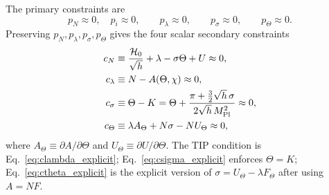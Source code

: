 \documentclass[aps,prd,reprint,nofootinbib,superscriptaddress,longbibliography]{revtex4-2}
\newcommand{\mpl}{M_{\rm Pl}}
\begin{document}
The primary constraints are
\begin{equation}
  p_N\approx0,\quad p_i\approx0,\qquad p_\lambda\approx0,\qquad p_\sigma\approx0,\qquad p_\Theta\approx0 .
\end{equation}
Preserving $p_N,p_\lambda,p_\sigma,p_\Theta$ gives the four scalar secondary constraints
\begin{align}
  c_N&\equiv \frac{\mathcal H_0}{\sqrt h}+\lambda-\sigma\Theta+U\approx0,
  \label{eq:cN_explicit}\\
  c_\lambda&\equiv N-A(\Theta,\chi)\approx0,
  \label{eq:clambda_explicit}\\
  c_\sigma&\equiv \Theta-K
  =\Theta+\frac{\pi+\frac{3}{2}\sqrt h\,\sigma}{2\sqrt h\,\mpl^2}\approx0,
  \label{eq:csigma_explicit}\\
  c_\Theta&\equiv \lambda A_\Theta+N\sigma-NU_\Theta\approx0,
  \label{eq:ctheta_explicit}
\end{align}
where $A_\Theta\equiv\partial A/\partial\Theta$ and $U_\Theta\equiv\partial U/\partial\Theta$. The TIP condition is Eq.~\eqref{eq:clambda_explicit}; Eq.~\eqref{eq:csigma_explicit} enforces $\Theta=K$; Eq.~\eqref{eq:ctheta_explicit} is the explicit version of $\sigma=U_\Theta-\lambda F_\Theta$ after using $A=NF$.
\end{document}
